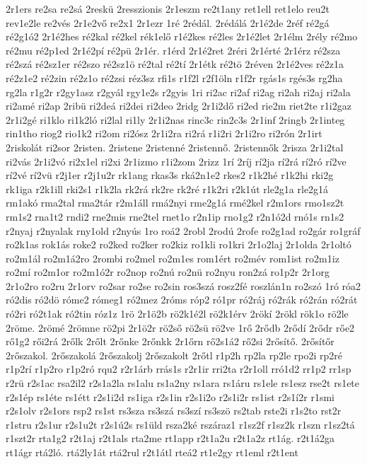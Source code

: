 {2r1ers
re2sa
re2sá
2reskü
2resszionis
2r1eszm
re2t1any
ret1ell
ret1elo
reu2t
rev1e2le
re2vés
2r1e2vő
re2x1
2r1ezr
1ré
2rédál.
2rédálá
2r1é2de
2réf
ré2gá
ré2g1ó2
2r1é2hes
ré2kal
ré2kel
rék1elő
r1é2kes
ré2les
2r1é2let
2r1élm
2rély
ré2mo
ré2mu
ré2p1ed
2r1é2pí
ré2pü
2r1ér.
r1érd
2r1é2ret
2réri
2r1érté
2r1érz
ré2sza
ré2szá
ré2sz1er
ré2szo
ré2sz1ö
ré2tal
ré2tí
2r1étk
ré2tö
2réven
2r1é2ves
ré2z1a
ré2z1e2
ré2zin
ré2z1o
ré2zsi
réz3sz
rfi1s
r1f2l
r2f1öln
r1f2r
rgás1s
rgés3s
rg2ha
rg2la
r1g2r
r2gy1asz
r2gyál
rgy1e2s
r2gyis
1ri
ri2ac
ri2af
ri2ag
ri2ah
ri2aj
ri2ala
ri2amé
ri2ap
2ribü
ri2deá
ri2dei
ri2deo
2ridg
2r1i2dő
ri2ed
rie2m
riet2te
r1i2gaz
2r1i2gé
ri1klo
ri1k2ló
ri2lal
ri1ly
2r1i2nas
rinc3c
rin2c3s
2r1inf
2ringb
2r1integ
rin1tho
riog2
rio1k2
ri2om
ri2ósz
2r1i2ra
ri2rá
r1i2ri
2r1i2ro
ri2rón
2r1irt
2riskolát
ri2sor
2risten.
2ristene
2ristenné
2ristennő.
2ristennők
2risza
2r1i2tal
ri2vás
2r1i2vó
ri2x1el
ri2xi
2r1izmo
r1i2zom
2rizz
1rí
2ríj
rí2ja
rí2rá
rí2ró
rí2ve
rí2vé
rí2vü
r2j1er
r2j1u2r
rk1ang
rkas3s
rká2n1e2
rkes2
r1k2hé
r1k2hi
rki2g
rk1iga
r2k1ill
rki2s1
r1k2la
rk2rá
rk2re
rk2ré
r1k2ri
r2k1út
rle2g1a
rle2g1á
rm1akó
rma2tal
rma2tár
r2m1áll
rmá2nyi
rme2g1á
rmé2kel
r2m1ors
rmo1sz2t
rm1s2
rna1t2
rndi2
rne2mis
rne2tel
rnet1o
r2n1ip
rno1g2
r2n1ó2d
rnó1s
rn1s2
r2nyaj
r2nyalak
rny1old
r2nyús
1ro
roá2
2robl
2rodú
2rofe
ro2g1ad
ro2gár
ro1gráf
ro2k1as
rok1ás
roke2
ro2ked
ro2ker
ro2kiz
ro1kli
ro1kri
2r1o2laj
2r1olda
2r1oltó
ro2m1ál
ro2m1á2ro
2rombi
ro2mel
ro2m1es
rom1ért
ro2mév
rom1ist
ro2m1iz
ro2mí
ro2m1or
ro2m1ó2r
ro2nop
ro2nú
ro2nü
ro2nyu
ron2zá
ro1p2r
2r1org
2r1o2ro
ro2ru
2r1orv
ro2sar
ro2se
ro2sin
ros3szá
rosz2fé
roszlán1n
ro2szó
1ró
róa2
ró2dis
ró2dö
róme2
rómeg1
ró2mez
2róms
róp2
ró1pr
ró2ráj
ró2rák
ró2rán
ró2rát
ró2ri
ró2t1ak
ró2tin
róz1z
1rö
2r1ö2b
rö2k1é2l
rö2k1érv
2rökí
2rökl
rök1o
rö2le
2röme.
2römé
2römne
rö2pi
2r1ö2r
rö2ső
rö2sü
rö2ve
1rő
2rődb
2rődí
2rődr
rőe2
rő1g2
rői2rá
2rőlk
2rőlt
2rőnke
2rőnkk
2r1őrn
rő2s1á2
rő2si
2rősítő.
2rősítőr
2rőszakol.
2rőszakolá
2rőszakolj
2rőszakolt
2rőtl
r1p2h
rp2la
rp2le
rpo2i
rp2ré
r1p2rí
r1p2ro
r1p2ró
rqu2
r2r1árb
rrás1s
r2r1ir
rri2ta
r2r1oll
rró1d2
rr1p2
rr1sp
r2rü
r2s1ac
rsa2il2
r2s1a2la
rs1alu
rs1a2ny
rs1ara
rs1áru
rs1ele
rs1esz
rse2t
rs1ete
r2s1ép
rs1éte
rs1étt
r2s1i2d
rs1iga
r2s1in
r2s1i2o
r2s1i2r
rs1ist
r2s1í2r
r1smi
r2s1olv
r2s1ors
rsp2
rs1st
rs3sza
rs3szá
rs3szí
rs3szö
rs2tab
rste2i
r1s2to
rst2r
r1stru
r2s1ur
r2s1u2t
r2s1ú2s
rs1üld
rsza2ké
rszáraz1
r1sz2f
r1sz2k
r1szn
r1sz2tá
r1szt2r
rta1g2
r2t1aj
r2t1als
rta2me
rt1app
r2t1a2u
r2t1a2z
rt1ág.
r2t1á2ga
rt1ágr
rtá2ló.
rtá2ly1át
rtá2rul
r2t1átl
rteá2
rt1e2gy
rt1eml
r2t1ent
}
